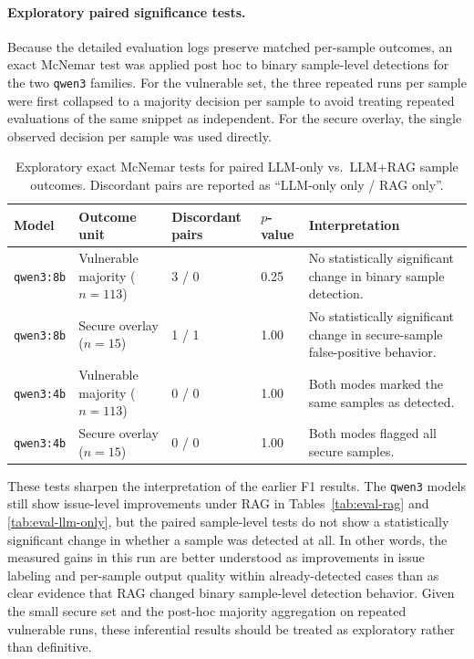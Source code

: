 \paragraph{Exploratory paired significance tests.}
Because the detailed evaluation logs preserve matched per-sample outcomes, an exact McNemar test was applied post hoc to binary sample-level detections for the two \texttt{qwen3} families. For the vulnerable set, the three repeated runs per sample were first collapsed to a majority decision per sample to avoid treating repeated evaluations of the same snippet as independent. For the secure overlay, the single observed decision per sample was used directly.

\begin{table}[H]
  \centering
  \caption{Exploratory exact McNemar tests for paired LLM-only vs.\ LLM+RAG sample outcomes. Discordant pairs are reported as ``LLM-only only / RAG only''.}
  \label{tab:rag-significance}
  \footnotesize
  \begin{tabularx}{\textwidth}{p{}p{}p{}p{}X}
    \toprule
    Model & Outcome unit & Discordant pairs & $p$-value & Interpretation \\
    \midrule
    \texttt{qwen3:8b} & Vulnerable majority ($n=113$) & 3 / 0 & 0.25 & No statistically significant change in binary sample detection. \\
    \texttt{qwen3:8b} & Secure overlay ($n=15$) & 1 / 1 & 1.00 & No statistically significant change in secure-sample false-positive behavior. \\
    \texttt{qwen3:4b} & Vulnerable majority ($n=113$) & 0 / 0 & 1.00 & Both modes marked the same samples as detected. \\
    \texttt{qwen3:4b} & Secure overlay ($n=15$) & 0 / 0 & 1.00 & Both modes flagged all secure samples. \\
    \bottomrule
  \end{tabularx}
\end{table}

These tests sharpen the interpretation of the earlier F1 results. The \texttt{qwen3} models still show issue-level improvements under RAG in Tables~\ref{tab:eval-rag} and \ref{tab:eval-llm-only}, but the paired sample-level tests do not show a statistically significant change in whether a sample was detected at all. In other words, the measured gains in this run are better understood as improvements in issue labeling and per-sample output quality within already-detected cases than as clear evidence that RAG changed binary sample-level detection behavior. Given the small secure set and the post-hoc majority aggregation on repeated vulnerable runs, these inferential results should be treated as exploratory rather than definitive.

